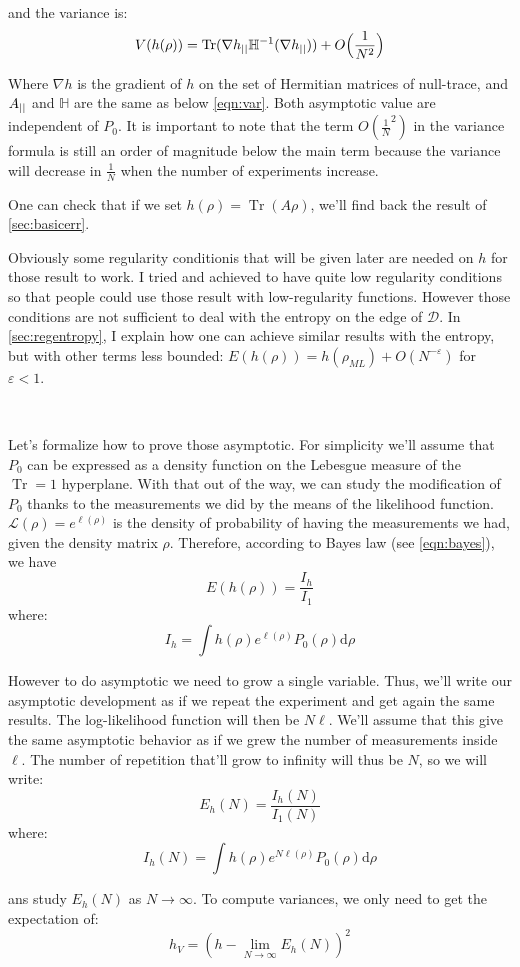 \documentclass[10pt,a4paper]{report}
\theoremstyle{plain}
\theoremstyle{definition}
\theoremstyle{remark}
\newcommand{\dd}{\mathrm{d}}
\DeclareMathOperator{\Tr}{Tr}
\newcommand{\ml}{_{M\!L}}
\begin{document}
and the variance is:
\[V(h(\rho)) = \Tr(\nabla h\pr \mathbb H\inv(\nabla h\pr)) +O\Big(\frac 1 {N^2}\Big)\]

Where $\nabla h$ is the gradient of $h$ on the set of Hermitian
matrices of null-trace, and $A_{||}$ and $\mathbb H$ are the same as below
\cref{eqn:var}. Both asymptotic value are independent of $P_0$. It is important
to note that the term $O(\frac 1 N^2)$ in the variance formula
is still an order of magnitude below
the main term because the variance will decrease in $\frac 1 N$ when the number
of experiments increase.

One can check that if we set
$h(\rho) = \Tr(A\rho)$, we'll find back the result of \cref{sec:basicerr}.

Obviously some
regularity conditionis that will be given later are needed on $h$ for those result
to work.
I tried and achieved to have quite low regularity conditions so that people could
use those result with low-regularity functions. However those conditions are not
sufficient to deal with the entropy on the edge of $\mathcal{D}$. In
\cref{sec:regentropy}, I explain how one can achieve similar results with the
entropy, but with other terms less bounded: $E(h(\rho)) = h(\rho\ml) +
O(N^{-\varepsilon})$ for $\varepsilon < 1$.

\

Let's formalize how to prove those asymptotic. For simplicity we'll assume that
$P_0$ can be expressed as a density function on the Lebesgue measure of the
$\Tr = 1$ hyperplane. With that out of the way, we can study the modification of
$P_0$ thanks to the measurements we did by the means of the likelihood function.
$\mathcal{L}(\rho) = e^{\ell(\rho)}$ is the density of probability of having
the measurements we had, given the density matrix $\rho$. Therefore, according to
Bayes law (see \cref{eqn:bayes}), we have
\[E(h(\rho)) = \frac{I_h}{I_1}\]
where:
\[I_h = \int h(\rho) e^{\ell(\rho)} P_0(\rho) \dd \rho \]

However to do asymptotic we need to grow a single variable. Thus, we'll write our
asymptotic development as if we repeat the experiment and get again the same
results. The log-likelihood function will then be $N\ell$. We'll assume that this
give the same asymptotic behavior as if we grew the number of measurements inside
$\ell$. The number of repetition that'll grow to infinity will thus be $N$, so we
will write:
\[E_h(N) = \frac{I_h(N)}{I_1(N)}\]
where:
\[I_h(N) = \int h(\rho) e^{N\ell(\rho)} P_0(\rho) \dd \rho \]

ans study $E_h(N)$ as $N \to \infty$. To compute variances, we only need to get
the expectation of:
\[h_V = \left(h - \lim_{N \to \infty} E_h(N)\right)^2\]
\end{document}
